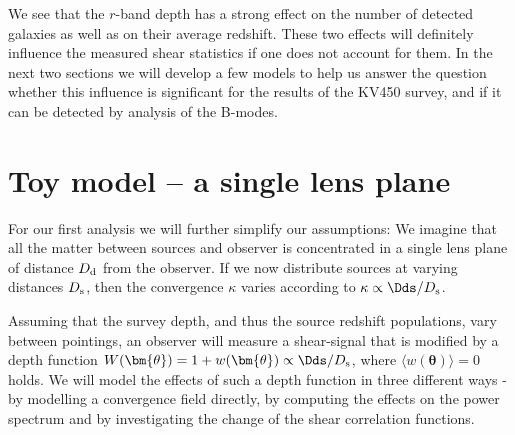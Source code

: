 We see that the $r$-band depth has a strong effect on the number of detected galaxies as well as on their average redshift. These two effects will definitely influence the measured shear statistics if one does not account for them. In the next two sections we will develop a few models to help us answer the question whether this influence is significant for the results of the KV450 survey, and if it can be detected by analysis of the B-modes.
\section{Toy model -- a single lens plane}
\label{sec:toy_model}
For our first analysis we will further simplify our assumptions: We imagine that all the matter between sources and observer is concentrated in a single lens plane of distance $D_{\rm d}$ from the observer. If we now distribute sources at varying distances $D_{\rm s}$, then the convergence $\kappa$ varies according to $\kappa \propto \Dds/D_{\rm s}$. 

Assuming that the survey depth, and thus the source redshift populations, vary between pointings, an observer will measure a shear-signal that is modified by a depth function $W(\bm{\theta}) = 1+w(\bm{\theta})\propto \Dds/D_{\rm s}$, where $\langle w(\bm{\theta})\rangle=0$ holds. We will model the effects of such a depth function in three different ways - by modelling a convergence field directly, by computing the effects on the power spectrum and by investigating the change of the shear correlation functions.


